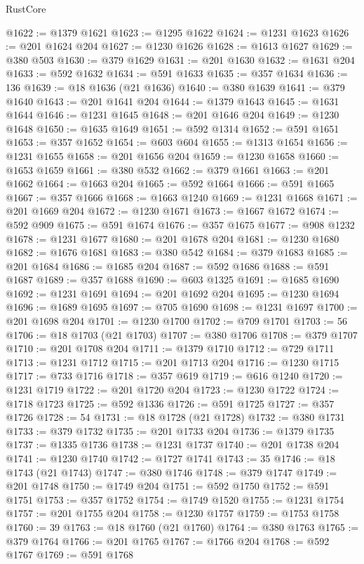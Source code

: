 \begin{lexlean}{RustCore}
\begin{coremodule}
@1622 := @1379 @1621
@1623 := @1295 @1622
@1624 := @1231 @1623
@1626 := @201 @1624 @204
@1627 := @1230 @1626
@1628 := @1613 @1627
@1629 := @380 @503
@1630 := @379 @1629
@1631 := @201 @1630
@1632 := @1631 @204
@1633 := @592 @1632
@1634 := @591 @1633
@1635 := @357 @1634
@1636 := 136
@1639 := @18 @1636 (@21 @1636)
@1640 := @380 @1639
@1641 := @379 @1640
@1643 := @201 @1641 @204
@1644 := @1379 @1643
@1645 := @1631 @1644
@1646 := @1231 @1645
@1648 := @201 @1646 @204
@1649 := @1230 @1648
@1650 := @1635 @1649
@1651 := @592 @1314
@1652 := @591 @1651
@1653 := @357 @1652
@1654 := @603 @604
@1655 := @1313 @1654
@1656 := @1231 @1655
@1658 := @201 @1656 @204
@1659 := @1230 @1658
@1660 := @1653 @1659
@1661 := @380 @532
@1662 := @379 @1661
@1663 := @201 @1662
@1664 := @1663 @204
@1665 := @592 @1664
@1666 := @591 @1665
@1667 := @357 @1666
@1668 := @1663 @1240
@1669 := @1231 @1668
@1671 := @201 @1669 @204
@1672 := @1230 @1671
@1673 := @1667 @1672
@1674 := @592 @909
@1675 := @591 @1674
@1676 := @357 @1675
@1677 := @908 @1232
@1678 := @1231 @1677
@1680 := @201 @1678 @204
@1681 := @1230 @1680
@1682 := @1676 @1681
@1683 := @380 @542
@1684 := @379 @1683
@1685 := @201 @1684
@1686 := @1685 @204
@1687 := @592 @1686
@1688 := @591 @1687
@1689 := @357 @1688
@1690 := @603 @1325
@1691 := @1685 @1690
@1692 := @1231 @1691
@1694 := @201 @1692 @204
@1695 := @1230 @1694
@1696 := @1689 @1695
@1697 := @705 @1690
@1698 := @1231 @1697
@1700 := @201 @1698 @204
@1701 := @1230 @1700
@1702 := @709 @1701
@1703 := 56
@1706 := @18 @1703 (@21 @1703)
@1707 := @380 @1706
@1708 := @379 @1707
@1710 := @201 @1708 @204
@1711 := @1379 @1710
@1712 := @729 @1711
@1713 := @1231 @1712
@1715 := @201 @1713 @204
@1716 := @1230 @1715
@1717 := @733 @1716
@1718 := @357 @619
@1719 := @616 @1240
@1720 := @1231 @1719
@1722 := @201 @1720 @204
@1723 := @1230 @1722
@1724 := @1718 @1723
@1725 := @592 @1336
@1726 := @591 @1725
@1727 := @357 @1726
@1728 := 54
@1731 := @18 @1728 (@21 @1728)
@1732 := @380 @1731
@1733 := @379 @1732
@1735 := @201 @1733 @204
@1736 := @1379 @1735
@1737 := @1335 @1736
@1738 := @1231 @1737
@1740 := @201 @1738 @204
@1741 := @1230 @1740
@1742 := @1727 @1741
@1743 := 35
@1746 := @18 @1743 (@21 @1743)
@1747 := @380 @1746
@1748 := @379 @1747
@1749 := @201 @1748
@1750 := @1749 @204
@1751 := @592 @1750
@1752 := @591 @1751
@1753 := @357 @1752
@1754 := @1749 @1520
@1755 := @1231 @1754
@1757 := @201 @1755 @204
@1758 := @1230 @1757
@1759 := @1753 @1758
@1760 := 39
@1763 := @18 @1760 (@21 @1760)
@1764 := @380 @1763
@1765 := @379 @1764
@1766 := @201 @1765
@1767 := @1766 @204
@1768 := @592 @1767
@1769 := @591 @1768

\end{coremodule}
\end{lexlean}
